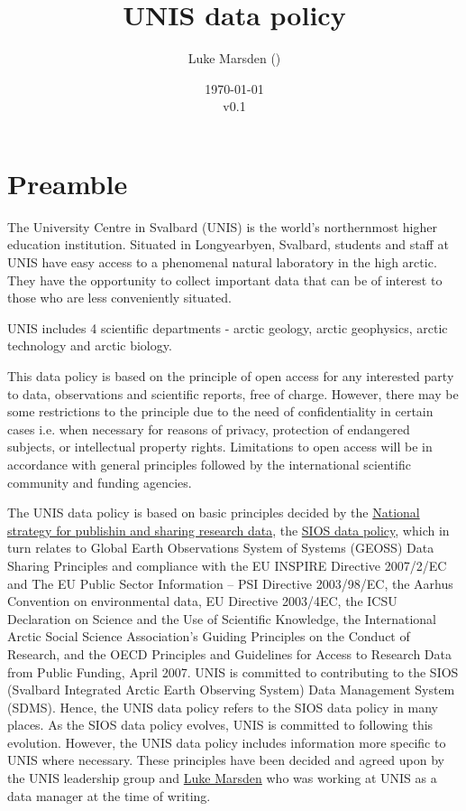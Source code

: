 \documentclass[a4paper,english, 11pt]{article}
\title{UNIS data policy}
\date{\today\\v0.1}
\author{Luke Marsden (\emailme)}
\begin{document}
\maketitle
\tableofcontents

\newpage

\section{Preamble}
\label{s:preamble}

The University Centre in Svalbard (UNIS) is the world's northernmost higher education institution. Situated in Longyearbyen, Svalbard, students and staff at UNIS have easy access to a phenomenal natural laboratory in the high arctic. They have the opportunity to collect important data that can be of interest to those who are less conveniently situated.

UNIS includes 4 scientific departments - arctic geology, arctic geophysics, arctic technology and arctic biology.

This data policy is based on the principle of open access for any interested party to data, observations and scientific reports, free of charge. However, there may be some restrictions to
the principle due to the need of confidentiality in certain cases i.e. when necessary for reasons
of privacy, protection of endangered subjects, or intellectual property rights. Limitations to open
access will be in accordance with general principles followed by the international scientific
community and funding agencies.    

The UNIS data policy is based on basic principles decided by the \href{https://www.regjeringen.no/no/dokumenter/nasjonal-strategi-for-tilgjengeliggjoring-og-deling-av-forskningsdata/id2582412/}{National strategy for publishin and sharing research data}, the \href{https://sios-svalbard.org/sites/sios-svalbard.org/files/common/SIOS_Data_Policy.pdf}{SIOS data policy}, which in turn relates to Global Earth Observations System of Systems (GEOSS) Data Sharing Principles and compliance with the EU INSPIRE Directive 2007/2/EC and The EU Public Sector Information – PSI Directive 2003/98/EC, the Aarhus Convention on environmental
data, EU Directive 2003/4EC, the ICSU Declaration on Science and the Use of Scientific Knowledge, the International Arctic Social Science Association’s Guiding Principles on the
Conduct of Research, and the OECD Principles and Guidelines for Access to Research Data from Public Funding, April 2007. UNIS is committed to contributing to the SIOS (Svalbard Integrated Arctic Earth Observing System) Data Management System (SDMS). Hence, the UNIS data policy refers to the SIOS data policy in many places. As the SIOS data policy evolves, UNIS is committed to following this evolution. However, the UNIS data policy includes information more specific to UNIS where necessary. These principles have been decided and agreed upon by the UNIS leadership group and \href{https://orcid.org/0000-0002-9746-544X}{Luke Marsden} who was working at UNIS as a data manager at the time of writing.  
\end{document}
